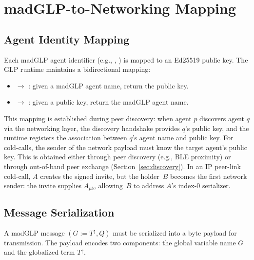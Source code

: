 \section{madGLP-to-Networking Mapping}
\label{sec:mapping}
\subsection{Agent Identity Mapping}
\label{sec:id-mapping}
Each madGLP agent identifier (e.g., , ) is mapped to an Ed25519 public key. The GLP runtime maintains a bidirectional mapping:
\begin{itemize}
\item {} $\to$ : given a madGLP agent name, return the public key.
\item {} $\to$ : given a public key, return the madGLP agent name.
\end{itemize}
This mapping is established during peer discovery: when agent $p$ discovers agent $q$ via the networking layer, the discovery handshake provides $q$'s public key, and the runtime registers the association between $q$'s agent name and public key.
For cold-calls, the sender of the network payload must know the target agent's public key. This is obtained either through peer discovery (e.g., BLE proximity) or through out-of-band peer exchange (Section~\ref{sec:discovery}).  In an IP peer-link cold-call, $A$ creates the signed invite, but the holder~$B$ becomes the first network sender: the invite supplies $A_{\mathit{pk}}$, allowing~$B$ to address $A$'s index-0 serializer.
\subsection{Message Serialization}
\label{sec:serialization}
A madGLP message $(G := T^\uparrow, Q)$ must be serialized into a byte payload for transmission. The payload encodes two components: the global variable name $G$ and the globalized term $T^\uparrow$.
